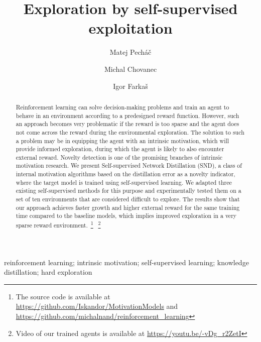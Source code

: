 \documentclass[a4paper,11pt]{elsarticle}
\begin{document}
\begin{frontmatter}
\date{}

\title{Exploration by self-supervised exploitation}

\author[1,*]{Matej Pech\'a\v{c}}
\author[2]{Michal Chovanec}
\author[1]{Igor Farka\v{s}}

\address[1]{Department of Applied Informatics, Comenius University, Bratislava, Slovak Republic}
\address[2]{Photoneo, Ltd., Bratislava, Slovak Republic}
\address[*]{Correspondence: matej.pechac@fmph.uniba.sk}



\begin{abstract}
Reinforcement learning can solve decision-making problems and train an agent to behave in an environment according to a predesigned reward function. However, such an approach becomes very problematic if the reward is too sparse and the agent does not come across the reward during the environmental exploration. The solution to such a problem may be in equipping the agent with an intrinsic motivation, which will provide informed exploration, during which the agent is likely to also encounter external reward. Novelty detection is one of the promising branches of intrinsic motivation research. We present Self-supervised Network Distillation (SND), a class of internal motivation algorithms based on the distillation error as a novelty indicator, where the target model is trained using self-supervised learning. We adapted three existing self-supervised methods for this purpose and experimentally tested them on a set of ten environments that are considered difficult to explore. The results show that our approach achieves faster growth and higher external reward for the same training time compared to the baseline models, which implies improved exploration in a very sparse reward environment.~\footnote{The source code is available at \url{https://github.com/Iskandor/MotivationModels} and \url{https://github.com/michalnand/reinforcement_learning}}
~\footnote{Video of our trained agents is available at \url{https://youtu.be/-vDg_r2ZetI}}
\end{abstract}

\begin{keyword}
reinforcement learning; intrinsic motivation; self-supervised learning; knowledge distillation; hard exploration
\end{keyword}
\end{frontmatter}
\end{document}
